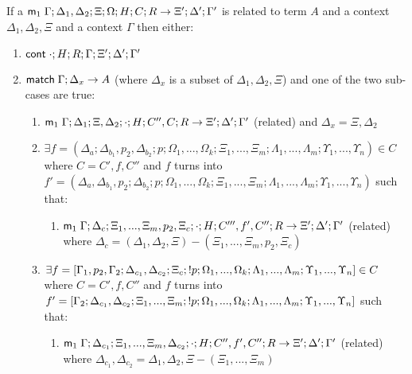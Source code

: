 \begin{theorem}

If a $\mathsf{m}_1 \; \Gamma; \Delta_1, \Delta_2; \Xi; \Omega; H; C; R \rightarrow \Xi'; \Delta'; \Gamma'$ is related to term $A$ and a context $\Delta_1, \Delta_2, \Xi$ and a context $\Gamma$ then either:

\begin{enumerate}
   \item $\mathsf{cont} \; \cdot; H; R; \Gamma; \Xi'; \Delta'; \Gamma'$
   \item $\mathsf{match} \; \Gamma; \Delta_x \rightarrow A$ (where $\Delta_x$ is a subset of $\Delta_1, \Delta_2, \Xi$) and one of the two sub-cases are true:
      \begin{enumerate}
         \item $\mathsf{m}_1 \; \Gamma; \Delta_1; \Xi, \Delta_2; \cdot; H; C'', C; R \rightarrow \Xi'; \Delta'; \Gamma'$ (related) and $\Delta_x = \Xi, \Delta_2$
         \item $\exists f = (\Delta_a; \Delta_{b_1}, p_2, \Delta_{b_2}; p; \Omega_1, ..., \Omega_k; \Xi_1, ..., \Xi_m; \Lambda_1, ..., \Lambda_m; \Upsilon_1, ..., \Upsilon_n) \in C$ where $C = C', f, C''$ and $f$ turns into $f' = (\Delta_a, \Delta_{b_1}, p_2; \Delta_{b_2}; p; \Omega_1, ..., \Omega_k; \Xi_1, ..., \Xi_m; \Lambda_1, ..., \Lambda_m; \Upsilon_1, ..., \Upsilon_n)$ such that:
         \begin{enumerate}
            \item $\mathsf{m}_1 \; \Gamma; \Delta_c; \Xi_1, ..., \Xi_m, p_2, \Xi_c; \cdot; H; C''', f', C''; R \rightarrow \Xi'; \Delta'; \Gamma'$ (related) where $\Delta_c = (\Delta_1, \Delta_2, \Xi) - (\Xi_1, ..., \Xi_m, p_2, \Xi_c)$
         \end{enumerate}
         \item $\exists f = [\Gamma_1, p_2, \Gamma_2; \Delta_{c_1}, \Delta_{c_2}; \Xi_c; {!} p; \Omega_1, ..., \Omega_k; \Lambda_1, ..., \Lambda_m; \Upsilon_1, ..., \Upsilon_n] \in C$ where $C = C', f, C''$ and $f$ turns into $f' = [\Gamma_2; \Delta_{c_1}, \Delta_{c_2}; \Xi_1, ..., \Xi_m; {!} p; \Omega_1, ..., \Omega_k; \Lambda_1, ..., \Lambda_m; \Upsilon_1, ..., \Upsilon_n]$ such that:
         \begin{enumerate}
            \item $\mathsf{m}_1 \; \Gamma; \Delta_{c_1}; \Xi_1, ..., \Xi_m, \Delta_{c_2}; \cdot; H; C'', f', C''; R \rightarrow \Xi'; \Delta'; \Gamma'$ (related) where $\Delta_{c_1}, \Delta_{c_2} = \Delta_1, \Delta_2, \Xi - (\Xi_1, ..., \Xi_m)$
         \end{enumerate}
      \end{enumerate}
\end{enumerate}


\end{theorem}
